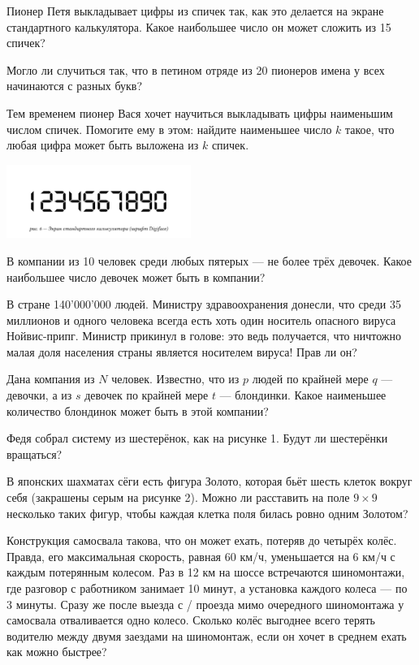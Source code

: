 \begin{itemize}
\itA Пионер Петя выкладывает цифры из спичек так, как это делается на экране стандартного калькулятора. Какое наибольшее число он может сложить из 15 спичек?

\itB Могло ли случиться так, что в петином отряде из 20 пионеров имена у всех начинаются с разных букв?

\itC Тем временем пионер Вася хочет научиться выкладывать цифры наименьшим числом спичек. Помогите ему в этом: найдите наименьшее число $k$ такое, что любая цифра может быть выложена из $k$ спичек. 
\end{itemize}

\begin{center}
  \includegraphics[width=6cm]{stats/2016/Figures/Digiface.png}
\end{center}

\begin{itemize}
\itA В компании из 10 человек среди любых пятерых — не более трёх девочек. Какое наибольшее число девочек может быть в компании?

\itB В стране 140'000'000 людей. Министру здравоохранения донесли, что среди 35 миллионов и одного человека всегда есть хоть один носитель опасного вируса Нойвис-припг. Министр прикинул в голове: это ведь получается, что ничтожно малая доля населения страны является носителем вируса! Прав ли он?

\itC Дана компания из $N$ человек. Известно, что из $p$ людей по крайней мере $q$ --- девочки, а из $s$ девочек по крайней мере $t$ --- блондинки. Какое наименьшее количество блондинок может быть в этой компании?
\end{itemize}

\begin{itemize}
\itA Федя собрал систему из шестерёнок, как на рисунке 1. Будут ли шестерёнки вращаться?

\itB В японских шахматах сёги есть фигура Золото, которая бьёт шесть клеток вокруг себя (закрашены серым на рисунке 2). Можно ли расставить на поле $9 \times 9$ несколько таких фигур, чтобы каждая клетка поля билась ровно одним Золотом?

\itC Конструкция самосвала такова, что он может ехать, потеряв до четырёх колёс. Правда, его максимальная скорость, равная 60 км/ч, уменьшается на 6 км/ч с каждым потерянным колесом. Раз в 12 км на шоссе встречаются шиномонтажи, где разговор с работником занимает 10 минут, а установка каждого колеса — по 3 минуты. Сразу же после выезда с / проезда мимо очередного шиномонтажа у самосвала отваливается одно колесо. Сколько колёс выгоднее всего терять водителю между двумя заездами на шиномонтаж, если он хочет в среднем ехать как можно быстрее?
\end{itemize}

